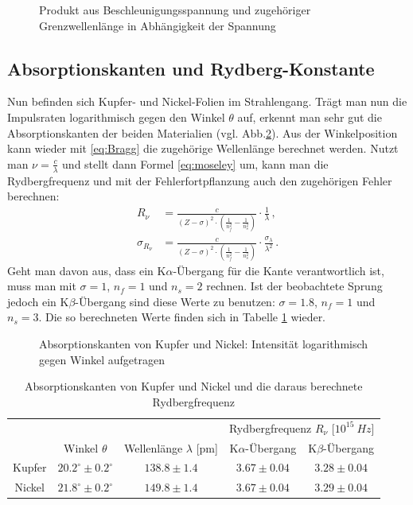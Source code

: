 \documentclass[12pt,a4paper,titlepage,headinclude,bibtotoc]{scrartcl}
\begin{document}
\begin{figure}[!htb]
	\centering
	
	\caption{Produkt aus Beschleunigungsspannung und zugehöriger Grenzwellenlänge in Abhängigkeit der Spannung}
	\label{fig:grenzLambda}
\end{figure}

\subsection{Absorptionskanten und Rydberg-Konstante}
Nun befinden sich Kupfer- und Nickel-Folien im Strahlengang.
Trägt man nun die Impulsraten logarithmisch gegen den Winkel $\theta$ auf, erkennt man sehr gut die Absorptionskanten der beiden Materialien (vgl. Abb.\ref{fig:messung4}).
Aus der Winkelposition kann wieder mit \eqref{eq:Bragg} die zugehörige Wellenlänge berechnet werden.
Nutzt man $\nu=\frac{c}{\lambda}$ und stellt dann Formel \eqref{eq:moseley} um, kann man die Rydbergfrequenz und mit der Fehlerfortpflanzung auch den zugehörigen Fehler berechnen:
\begin{align}
	R_\nu&=\frac{c}{(Z-\sigma)^2\cdot\left(\frac{1}{n_f^2}-\frac{1}{n_s^2}\right)}\cdot \frac{1}{\lambda}\,,\\
	\sigma_{R_\nu}&=\frac{c}{(Z-\sigma)^2\cdot\left(\frac{1}{n_f^2}-\frac{1}{n_s^2}\right)}\cdot \frac{\sigma_\lambda}{\lambda^2}\,.
\end{align}
Geht man davon aus, dass ein K$\alpha$-Übergang für die Kante verantwortlich ist, muss man mit $\sigma=1$, $n_f=1$ und $n_s=2$ rechnen.
Ist der beobachtete Sprung jedoch ein K$\beta$-Übergang sind diese Werte zu benutzen: $\sigma=1.8$, $n_f=1$ und $n_s=3$.
Die so berechneten Werte finden sich in Tabelle \ref{tab:Rydberg} wieder.
\begin{figure}[!htb]
	\centering
	
	\caption{Absorptionskanten von Kupfer und Nickel: Intensität logarithmisch gegen Winkel aufgetragen}
	\label{fig:messung4}
\end{figure}

\begin{table}[!htb]
	\centering
	\begin{tabular}{|c|c|c|c|c|}
		\hline
		& & & \multicolumn{2}{c|}{Rydbergfrequenz $R_\nu$ [$10^{15}~\si{Hz}$]} \\		
		& Winkel $\theta$ & Wellenlänge $\lambda$ [pm] & K$\alpha$-Übergang & K$\beta$-Übergang\\
		\hline
		Kupfer & $20.2^\circ \pm 0.2^\circ$ & $138.8 \pm 1.4$ & $3.67 \pm 0.04$ & $3.28 \pm 0.04$\\
		Nickel & $21.8^\circ \pm 0.2^\circ$ & $149.8 \pm 1.4$ & $3.67 \pm 0.04$ & $3.29 \pm 0.04$ \\
		\hline
	\end{tabular}
	\caption{Absorptionskanten von Kupfer und Nickel und die daraus berechnete Rydbergfrequenz}
	\label{tab:Rydberg}
\end{table}
\end{document}
